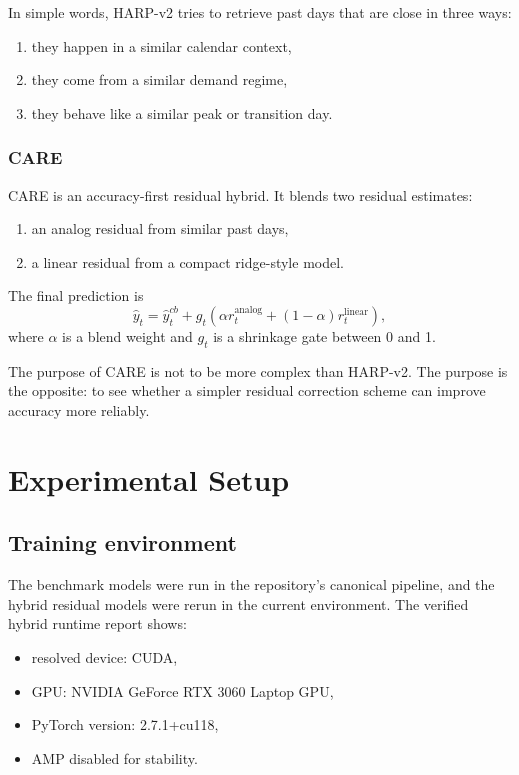 \documentclass[conference]{IEEEtran}
\begin{document}
In simple words, HARP-v2 tries to retrieve past days that are close in three ways:
\begin{enumerate}
\item they happen in a similar calendar context,
\item they come from a similar demand regime,
\item they behave like a similar peak or transition day.
\end{enumerate}

\subsubsection{CARE}
CARE is an accuracy-first residual hybrid. It blends two residual estimates:
\begin{enumerate}
\item an analog residual from similar past days,
\item a linear residual from a compact ridge-style model.
\end{enumerate}
The final prediction is
\begin{equation}
\hat{y}_t = \hat{y}^{cb}_t + g_t\!\left(\alpha r^{\mathrm{analog}}_t + (1-\alpha)r^{\mathrm{linear}}_t\right),
\end{equation}
where $\alpha$ is a blend weight and $g_t$ is a shrinkage gate between 0 and 1.

The purpose of CARE is not to be more complex than HARP-v2. The purpose is the opposite: to see whether a simpler residual correction scheme can improve accuracy more reliably.

\section{Experimental Setup}
\subsection{Training environment}
The benchmark models were run in the repository's canonical pipeline, and the hybrid residual models were rerun in the current environment. The verified hybrid runtime report shows:
\begin{itemize}
\item resolved device: CUDA,
\item GPU: NVIDIA GeForce RTX 3060 Laptop GPU,
\item PyTorch version: 2.7.1+cu118,
\item AMP disabled for stability.
\end{itemize}
\end{document}
